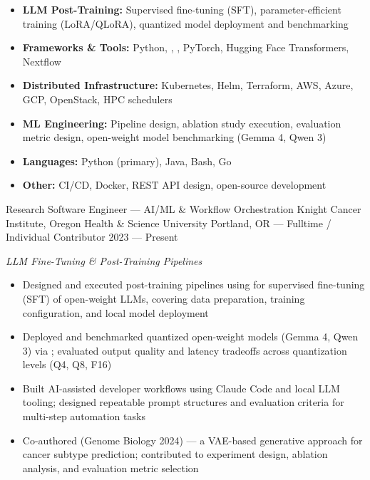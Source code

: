 




\begin{itemize}
    \item \textbf{LLM Post-Training:} Supervised fine-tuning (SFT), parameter-efficient training (LoRA/QLoRA), quantized model deployment and benchmarking
    \item \textbf{Frameworks \& Tools:} Python, , , PyTorch, Hugging Face Transformers, Nextflow
    \item \textbf{Distributed Infrastructure:} Kubernetes, Helm, Terraform, AWS, Azure, GCP, OpenStack, HPC schedulers
    \item \textbf{ML Engineering:} Pipeline design, ablation study execution, evaluation metric design, open-weight model benchmarking (Gemma 4, Qwen 3)
    \item \textbf{Languages:} Python (primary), Java, Bash, Go
    \item \textbf{Other:} CI/CD, Docker, REST API design, open-source development
\end{itemize}




\showoff
{Research Software Engineer --- AI/ML \& Workflow Orchestration}
{Knight Cancer Institute, Oregon Health \& Science University}
{Portland, OR --- Fulltime / Individual Contributor}
{2023 --- Present}

\emph{LLM Fine-Tuning \& Post-Training Pipelines}

\begin{itemize}
    \item Designed and executed post-training pipelines using  for supervised fine-tuning (SFT) of open-weight LLMs, covering data preparation, training configuration, and local model deployment
    \item Deployed and benchmarked quantized open-weight models (Gemma 4, Qwen 3) via ; evaluated output quality and latency tradeoffs across quantization levels (Q4, Q8, F16)
    \item Built AI-assisted developer workflows using Claude Code and local LLM tooling; designed repeatable prompt structures and evaluation criteria for multi-step automation tasks
    \item Co-authored  (Genome Biology 2024) --- a VAE-based generative approach for cancer subtype prediction; contributed to experiment design, ablation analysis, and evaluation metric selection
\end{itemize}

